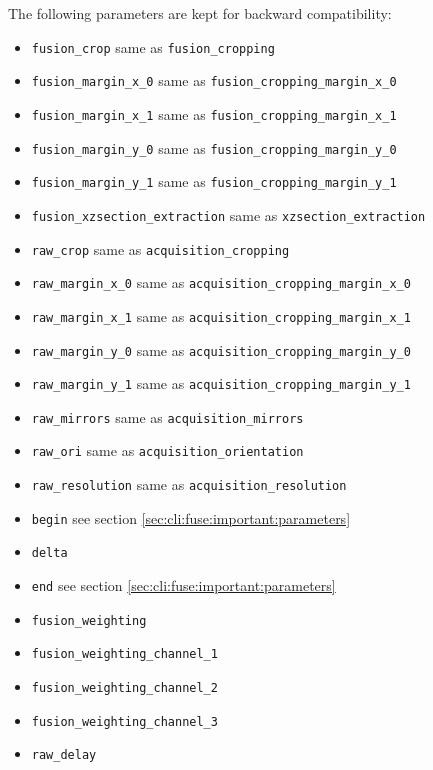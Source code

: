 The following parameters are kept for backward compatibility:
\begin{itemize}
\itemsep -0.5ex
\item \texttt{fusion\_crop} 
  same as \texttt{fusion\_cropping}
\item \texttt{fusion\_margin\_x\_0}
  same as \texttt{fusion\_cropping\_margin\_x\_0}
\item \texttt{fusion\_margin\_x\_1}
  same as \texttt{fusion\_cropping\_margin\_x\_1}
\item \texttt{fusion\_margin\_y\_0}
  same as \texttt{fusion\_cropping\_margin\_y\_0}
\item \texttt{fusion\_margin\_y\_1}
  same as \texttt{fusion\_cropping\_margin\_y\_1}
\item \texttt{fusion\_xzsection\_extraction} 
  same as \texttt{xzsection\_extraction}
\item \texttt{raw\_crop} 
  same as \texttt{acquisition\_cropping}
\item \texttt{raw\_margin\_x\_0}
  same as \texttt{acquisition\_cropping\_margin\_x\_0}
\item \texttt{raw\_margin\_x\_1}
  same as \texttt{acquisition\_cropping\_margin\_x\_1}
\item \texttt{raw\_margin\_y\_0}
  same as \texttt{acquisition\_cropping\_margin\_y\_0}
\item \texttt{raw\_margin\_y\_1}
  same as \texttt{acquisition\_cropping\_margin\_y\_1}
\item \texttt{raw\_mirrors} 
  same as \texttt{acquisition\_mirrors}
\item \texttt{raw\_ori} 
  same as \texttt{acquisition\_orientation}
\item \texttt{raw\_resolution} 
  same as \texttt{acquisition\_resolution}
\end{itemize}

\begin{itemize}
\itemsep -0.5ex
\item \texttt{begin} 
  see section \ref{sec:cli:fuse:important:parameters}
\item \texttt{delta}
\item \texttt{end} 
  see section \ref{sec:cli:fuse:important:parameters}
\item \texttt{fusion\_weighting}
\item \texttt{fusion\_weighting\_channel\_1}
\item \texttt{fusion\_weighting\_channel\_2}
\item \texttt{fusion\_weighting\_channel\_3}
\item \texttt{raw\_delay}
\end{itemize}










